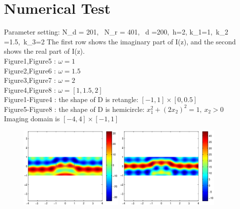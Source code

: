 \documentclass[12pt]{iopart}
\begin{document}
\section{Numerical Test}
Parameter setting:
\ben
N_d = 201, \ N_r = 401, \ d =200,\  h=2, k_1=1\omega,\ k_2 =1.5\omega,\ k_3=2\omega
\een 
The first row shows the imaginary part of I(z), and the second shows the real part of I(z). \\ 
Figure1,Figure5 : $\omega=1$\\
Figure2,Figure6 : $\omega=1.5$\\
Figure3,Figure7 : $\omega=2$\\
Figure4,Figure8 : $\omega=[1,1.5,2]$\\
Figure1-Figure4 : the shape of D is retangle: $[-1,1]\times[0,0.5]$ \\
Figure5-Figure8 : the shape of D is hemicircle: $x_1^2+(2x_2)^2=1,\ x_2>0$ \\
Imaging domain is $[-4,4]\times[-1,1]$
\begin{figure}
	\centering
	\includegraphics[width=0.45\textwidth]{./figure_rough/square_1}
	\includegraphics[width=0.45\textwidth]{./figure_rough/square_1_real}
	\caption{}\label{I1}
\end{figure}
\end{document}
